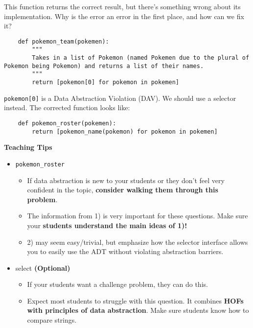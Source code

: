     
    \begin{blocksection}
    \question This function returns the correct result, but there's something wrong
    about its implementation. Why is the error an error in the first place, and how can we fix it?
    
    \begin{lstlisting}
    def pokemon_team(pokemen):
        """
        Takes in a list of Pokemon (named Pokemen due to the plural of Pokemon being Pokemon) and returns a list of their names.
        """
        return [pokemon[0] for pokemon in pokemen]
    \end{lstlisting}
    \begin{solution}[1in]
    \lstinline{pokemon[0]} is a Data Abstraction Violation (DAV).
    We should use a selector instead.
    The corrected function looks like:
    \begin{lstlisting}
    def pokemon_roster(pokemen):
        return [pokemon_name(pokemon) for pokemon in pokemen]
    \end{lstlisting}
    \end{solution}
    
    \end{blocksection}
    

    \begin{guide}
    \textbf{Teaching Tips}
    \begin{itemize}
        \item \texttt{pokemon\_roster}
        \begin{itemize}
            \item If data abstraction is new to your students or they don’t feel very confident in the topic, \textbf{consider walking them through this problem}.
            \item The information from 1) is very important for these questions. Make sure your \textbf{students understand the main ideas of 1)!}
            \item 2) may seem easy/trivial, but emphasize how the selector interface allows you to easily use the ADT without violating abstraction barriers.
        \end{itemize}
        \item select \textbf{(Optional)}
        \begin{itemize}
            \item If your students want a challenge problem, they can do this.
            \item Expect most students to struggle with this question. It combines \textbf{HOFs with principles of data abstraction}. Make sure students know how to compare strings.
        \end{itemize}
    \end{itemize}
    \end{guide}
    
